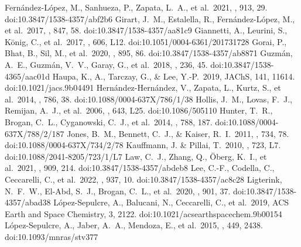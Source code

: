 \documentclass[twocolumn, twocolappendix]{aastex631}
\begin{document}
\begin{thebibliography}{}
 Fern{\'a}ndez-L{\'o}pez, M., Sanhueza, P., Zapata, L.~A., et al.\ 2021, \apj, 913, 29. doi:10.3847/1538-4357/abf2b6
 Girart, J.~M., Estalella, R., Fern{\'a}ndez-L{\'o}pez, M., et al.\ 2017, \apj, 847, 58. doi:10.3847/1538-4357/aa81c9
 Giannetti, A., Leurini, S., K{\"o}nig, C., et al.\ 2017, \aap, 606, L12. doi:10.1051/0004-6361/201731728
 Gorai, P., Bhat, B., Sil, M., et al.\ 2020, \apj, 895, 86. doi:10.3847/1538-4357/ab8871
 Guzm{\'a}n, A.~E., Guzm{\'a}n, V.~V., Garay, G., et al.\ 2018, \apjs, 236, 45. doi:10.3847/1538-4365/aac01d
 Haupa, K., A., Tarczay, G., \& Lee, Y.-P.\ 2019, JAChS, 141, 11614. doi:10.1021/jacs.9b04491
 Hern{\'a}ndez-Hern{\'a}ndez, V., Zapata, L., Kurtz, S., et al.\ 2014, \apj, 786, 38. doi:10.1088/0004-637X/786/1/38
 Hollis, J.~M., Lovas, F.~J., Remijan, A.~J., et al.\ 2006, \apjl, 643, L25. doi:10.1086/505110
 Hunter, T.~R., Brogan, C.~L., Cyganowski, C.~J., et al.\ 2014, \apj, 788, 187. doi:10.1088/0004-637X/788/2/187
 Jones, B.~M., Bennett, C.~J., \& Kaiser, R.~I.\ 2011, \apj, 734, 78. doi:10.1088/0004-637X/734/2/78
 Kauffmann, J. \& Pillai, T.\ 2010, \apjl, 723, L7. doi:10.1088/2041-8205/723/1/L7
 Law, C.~J., Zhang, Q., {\"O}berg, K.~I., et al.\ 2021, \apj, 909, 214. doi:10.3847/1538-4357/abdeb8
 Lee, C.-F., Codella, C., Ceccarelli, C., et al.\ 2022, \apj, 937, 10. doi:10.3847/1538-4357/ac8c28
 Ligterink, N.~F.~W., El-Abd, S.~J., Brogan, C.~L., et al.\ 2020, \apj, 901, 37. doi:10.3847/1538-4357/abad38
 L{\'o}pez-Sepulcre, A., Balucani, N., Ceccarelli, C., et al.\ 2019, ACS Earth and Space Chemistry, 3, 2122. doi:10.1021/acsearthspacechem.9b00154
 L{\'o}pez-Sepulcre, A., Jaber, A.~A., Mendoza, E., et al.\ 2015, \mnras, 449, 2438. doi:10.1093/mnras/stv377

\end{thebibliography}
\end{document}
